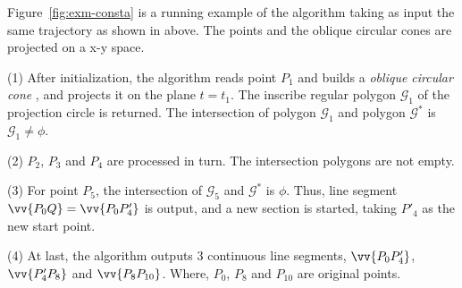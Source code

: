 \begin{example}
\label{exm-alg-conesta}
Figure~\ref{fig:exm-consta} is a running example of the \cista algorithm taking as input the same trajectory as shown in above.
The points and the oblique circular cones are projected on a x-y space.

\ni (1) After initialization, the \cista algorithm reads point $P_1$ and builds a \emph{oblique circular cone} , and projects it on the plane $t=t_1$. The inscribe regular polygon $\mathcal{G}_1$ of the projection circle is returned. The intersection of polygon $\mathcal{G}_1$ and polygon $\mathcal{G}^*$ is $\mathcal{G}_1 \ne \phi$.

\ni (2) $P_2$, $P_3$ and $P_4$ are processed in turn. The intersection polygons are not empty.

\ni (3) For point $P_5$, the intersection of $\mathcal{G}_5$ and $\mathcal{G}^*$ is $\phi$. Thus, line segment $\vv{P_0Q} =\vv{P_0P'_4}$ is output, and a new section is started, taking $P'_4$ as the new start point.

\ni (4) At last, the algorithm outputs 3 continuous line segments, \ie $\vv{P_0P'_4}$, $\vv{P'_4P_8}$ and $\vv{P_8P_{10}}$. Where, $P_0$, $P_8$ and $P_{10}$ are original points.
\end{example}








